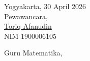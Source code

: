 \vspace{0.5cm}

\begin{flushright}
    \begin{minipage}{0.48\textwidth}
        \raggedright
        Yogyakarta, 30 April 2026 \\
        Pewawancara,\\[1.5cm]
        \underline{Toriq Afanudin} \\
        NIM 1900006105
    \end{minipage}
    \hfill
    \begin{minipage}{0.48\textwidth}
        \centering
        Guru Matematika,\\[1.5cm]
        \underline{\hspace{6cm}}\\
    \end{minipage}
\end{flushright}